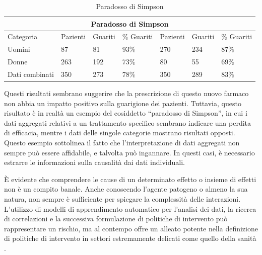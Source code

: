 \begin{table}[H]
    \centering
    \caption{Paradosso di Simpson}
    \begin{tabular}{ |p{2.2cm}||p{1.6cm}|p{1.6cm}|p{1.6cm}||p{1.6cm}|p{1.6cm}|p{1.6cm}| }
        \hline
        \multicolumn{7}{|c|}{Paradosso di Simpson} \\
        \hline
        Categoria & Pazienti & Guariti & \% Guariti & Pazienti & Guariti & \% Guariti\\
        \hline
        Uomini & 87 & 81 & 93\% & 270 & 234 & 87\% \\
        Donne & 263 & 192 & 73\% & 80 & 55 & 69\% \\
        Dati combinati & 350 & 273 & 78\% & 350 & 289 & 83\% \\
        \hline
    \end{tabular}
\end{table}

Questi risultati sembrano suggerire che la prescrizione di questo 
nuovo farmaco non abbia un impatto positivo sulla guarigione dei 
pazienti. Tuttavia, questo risultato è in realtà un esempio del 
cosiddetto ``paradosso di Simpson'', in cui i dati aggregati relativi 
a un trattamento specifico sembrano indicare una perdita di efficacia, 
mentre i dati delle singole categorie mostrano risultati opposti. 
Questo esempio sottolinea il fatto che l'interpretazione di dati 
aggregati non sempre può essere affidabile, e talvolta può ingannare. 
In questi casi, è necessario estrarre le informazioni sulla causalità 
dai dati individuali.

È evidente che comprendere le cause di un determinato effetto o 
insieme di effetti non è un compito banale. Anche conoscendo 
l'agente patogeno o almeno la sua natura, non sempre è sufficiente 
per spiegare la complessità delle interazioni. 
L'utilizzo di modelli di apprendimento automatico per l'analisi dei 
dati, la ricerca di correlazioni e la successiva formulazione di 
politiche di intervento può rappresentare un rischio, ma al contempo 
offre un alleato potente nella definizione di politiche di intervento 
in settori estremamente delicati come quello della sanità 
\cite{doi:10.1098/rsos.220638}.